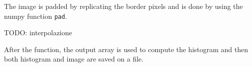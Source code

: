 \documentclass[10pt,twocolumn,letterpaper]{article}
\begin{document}
The image is padded by replicating the border pixels and is done by using the numpy function \verb"pad".

TODO: interpolazione

After the function, the output array is used to compute the histogram and then both histogram and image are saved on a file. 
%
%
%
%
%
%
%
%
%
%
\end{document}
